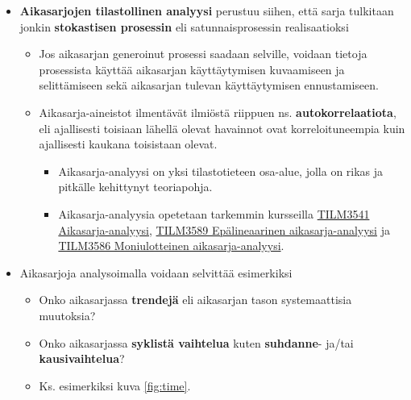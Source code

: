 \documentclass[
]{book}
\providecommand{\tightlist}{%
  \setlength{\itemsep}{0pt}\setlength{\parskip}{0pt}}
\begin{document}
\begin{itemize}
\tightlist
\item
  \textbf{Aikasarjojen tilastollinen analyysi} perustuu siihen, että sarja tulkitaan jonkin \textbf{stokastisen prosessin} eli satunnaisprosessin realisaatioksi

  \begin{itemize}
  \tightlist
  \item
    Jos aikasarjan generoinut prosessi saadaan selville, voidaan tietoja prosessista käyttää aikasarjan käyttäytymisen kuvaamiseen ja selittämiseen sekä aikasarjan tulevan käyttäytymisen ennustamiseen.
  \item
    Aikasarja-aineistot ilmentävät ilmiöstä riippuen ns. \textbf{autokorrelaatiota}, eli ajallisesti toisiaan lähellä olevat havainnot ovat korreloituneempia kuin ajallisesti kaukana toisistaan olevat.

    \begin{itemize}
    \tightlist
    \item
      Aikasarja-analyysi on yksi tilastotieteen osa-alue, jolla on rikas ja pitkälle kehittynyt teoriapohja.
    \item
      Aikasarja-analyysia opetetaan tarkemmin kursseilla \href{https://opas.peppi.utu.fi/fi/opintojakso/TILM3541/5076}{TILM3541 Aikasarja-analyysi}, \href{https://opas.peppi.utu.fi/fi/opintojakso/TILM3589/8393}{TILM3589 Epälineaarinen aikasarja-analyysi} ja \href{https://opas.peppi.utu.fi/fi/opintojakso/TILM3586/6973}{TILM3586 Moniulotteinen aikasarja-analyysi}.
    \end{itemize}
  \end{itemize}
\item
  Aikasarjoja analysoimalla voidaan selvittää esimerkiksi

  \begin{itemize}
  \tightlist
  \item
    Onko aikasarjassa \textbf{trendejä} eli aikasarjan tason systemaattisia muutoksia?
  \item
    Onko aikasarjassa \textbf{syklistä vaihtelua} kuten \textbf{suhdanne}- ja/tai \textbf{kausivaihtelua}?
  \item
    Ks. esimerkiksi kuva \ref{fig:time}.
  \end{itemize}
\end{itemize}

\FloatBarrier
\end{document}
